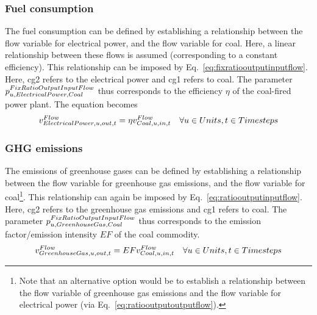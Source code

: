 \subsubsection{Fuel consumption}
The fuel consumption can be defined by establishing a relationship between the flow variable for electrical power, and the flow variable for coal. Here, a linear relationship between these flows is assumed (corresponding to a constant efficiency). This relationship can be imposed by Eq.~\eqref{eq:fixratiooutputinputflow}. Here, cg2 refers to the electrical power and cg1 refers to coal. The parameter $\pFixRatioOutputInputFlow[u,ElectricalPower,Coal]$ thus corresponds to the efficiency $\eta$ of the coal-fired power plant. The equation becomes
\begin{align}
\vFlow[ElectricalPower,u,out,t] = \eta \vFlow[Coal,u,in,t] \quad \forall \units, \timesteps
\end{align}

\subsubsection{GHG emissions}
The emissions of greenhouse gases can be defined by establishing a relationship between the flow variable for greenhouse gas emissions, and the flow variable for coal\footnote{Note that an alternative option would be to establish a relationship between the flow variable of greenhouse gas emissions and the flow variable for electrical power (via Eq.~\eqref{eq:ratiooutputoutputflow}).}. This relationship can again be imposed by Eq.~\eqref{eq:ratiooutputinputflow}. Here, cg2 refers to the greenhouse gas emissions and cg1 refers to coal. The parameter $\pFixRatioOutputInputFlow[u,GreenhouseGas,Coal]$ thus corresponds to the emission factor/emission intensity $EF$ of the coal commodity. 
\begin{align}
\vFlow[GreenhouseGas,u,out,t] =  EF \vFlow[Coal,u,in,t] \quad \forall \units, \timesteps
\end{align}

